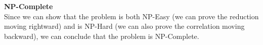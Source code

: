 \documentclass{article}
\begin{document}
\begin{enumerate}
\textbf{NP-Complete} \\
Since we can show that the problem is both NP-Easy (we can prove the reduction moving rightward) and is NP-Hard (we can also prove the correlation moving backward), we can conclude that the problem is NP-Complete. 






















\end{enumerate}
\end{document}
